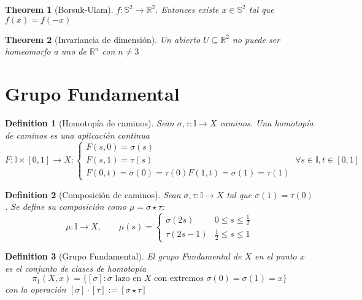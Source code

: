 \documentclass[leqno]{article}
\newtheorem*{definition}{Definition}
\newtheorem*{theorem}{Theorem}
\begin{document}
\begin{theorem}[Borsuk-Ulam]
$f: \mathbb{S}^2 \to \mathbb{R}^2 $. Entonces existe $x \in \mathbb{S}^2$ tal que $f(x) = f(-x)$
\end{theorem}

\begin{theorem}[Invariancia de dimensión]
Un abierto $U\subseteq \mathbb{R}^2$ no puede ser homeomorfo a uno de $\mathbb{R}^n$ con $n\neq 3$
\end{theorem}



\section{Grupo Fundamental}
\begin{definition}[Homotopía de caminos]
  Sean $\sigma , \tau : \mathbb{I} \to X$ caminos. Una homotopía de caminos es una aplicación continua 
  \[
  F:\mathbb{I}\times [0, 1] \to  X : \begin{cases}
    F(s, 0) = \sigma (s) \\
	F(s, 1) = \tau (s) \\
    F(0, t) = \sigma(0) = \tau (0)
    F(1, t) = \sigma(1) = \tau (1)
  \end{cases} \ \forall s \in \mathbb{I}, t \in [0,1]
  \] 
\end{definition}

\begin{definition}[Composición de caminos] Sean $\sigma , \tau : \mathbb{I} \to X $ tal que $\sigma (1) = \tau (0)$. Se define su composición como $\mu = \sigma \star \tau $:
  \[
  \mu: \mathbb{I} \to X, \qquad \mu(s) = \begin{cases}
	\sigma (2s) & 0\le s\le \frac{1}{2} \\
	\tau (2s-1) & \frac{1}{2} \le s\le 1
  \end{cases}
  \] 

\end{definition}

\begin{definition}[Grupo Fundamental]
  El grupo Fundamental de $X$ en el punto $x$ es el conjunto de clases de homotopía
  \[
  \pi_1(X, x) = \{[\sigma ] : \sigma \text{ lazo en } X \text{ con extremos } \sigma (0) = \sigma (1)=x\}
  \] 
  con la operación $[\sigma ]\cdot [\tau ] := [\sigma \star \tau ]$
\end{definition}
\end{document}
